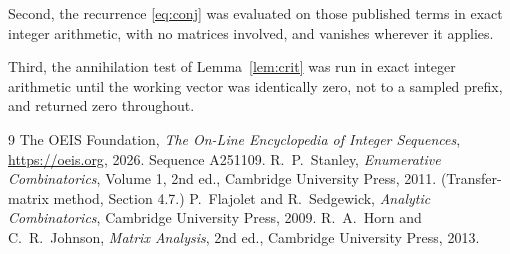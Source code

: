 \documentclass[11pt,a4paper]{article}
\theoremstyle{plain}
\theoremstyle{definition}
\begin{document}
Second, the recurrence \eqref{eq:conj} was evaluated on those published terms in exact
integer arithmetic, with no matrices involved, and vanishes wherever it applies.

Third, the annihilation test of Lemma~\ref{lem:crit} was run in exact integer arithmetic
until the working vector was identically zero, not to a sampled prefix, and returned zero
throughout.

\begin{thebibliography}{9}
 The OEIS Foundation, \emph{The On-Line Encyclopedia of Integer
Sequences}, \url{https://oeis.org}, 2026. Sequence A251109.
 R.~P.~Stanley, \emph{Enumerative Combinatorics}, Volume 1, 2nd ed.,
Cambridge University Press, 2011. (Transfer-matrix method, Section 4.7.)
 P.~Flajolet and R.~Sedgewick, \emph{Analytic Combinatorics}, Cambridge
University Press, 2009.
 R.~A.~Horn and C.~R.~Johnson, \emph{Matrix Analysis}, 2nd ed., Cambridge
University Press, 2013.
\end{thebibliography}
\end{document}
